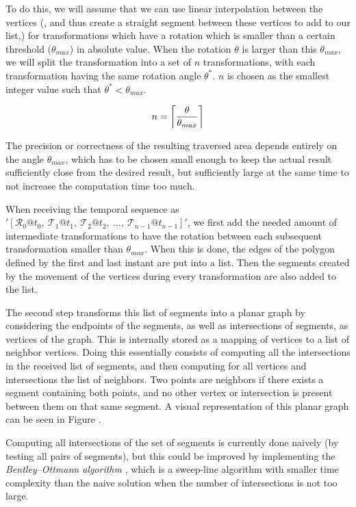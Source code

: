 To do this, we will assume that we can use linear interpolation between the vertices (, and thus create a straight segment between these vertices to add to our list,) for transformations which have a rotation which is smaller than a certain threshold ($\theta_{max}$) in absolute value. When the rotation $\theta$ is larger than this $\theta_{max}$, we will split the transformation into a set of $n$ transformations, with each transformation having the same rotation angle $\theta^*$. $n$ is chosen as the smallest integer value such that $\theta^* < \theta_{max}$.

\[
    n = \ceil*{\frac{\theta}{\theta_{max}}}
\]

The precision or correctness of the resulting traversed area depends entirely on the angle $\theta_{max}$, which has to be chosen small enough to keep the actual result sufficiently close from the desired result, but sufficiently large at the same time to not increase the computation time too much.

When receiving the temporal sequence as $'[\mathcal{R}_0@t_0,\ \mathcal{T}_1@t_1,\ \mathcal{T}_2@t_2,\ ...,\ \mathcal{T}_{n-1}@t_{n-1}]'$, we first add the needed amount of intermediate transformations to have the rotation between each subsequent transformation smaller than $\theta_{max}$. When this is done, the edges of the polygon defined by the first and last instant are put into a list. Then the segments created by the movement of the vertices during every transformation are also added to the list.


The second step transforms this list of segments into a planar graph by considering the endpoints of the segments, as well as intersections of segments, as vertices of the graph. This is internally stored as a mapping of vertices to a list of neighbor vertices. Doing this essentially consists of computing all the intersections in the received list of segments, and then computing for all vertices and intersections the list of neighbors. Two points are neighbors if there exists a segment containing both points, and no other vertex or intersection is present between them on that same segment. A visual representation of this planar graph can be seen in Figure .

Computing all intersections of the set of segments is currently done naively (by testing all pairs of segments), but this could be improved by implementing the \textit{Bentley–Ottmann algorithm} \cite{computational_geometry}, which is a sweep-line algorithm with smaller time complexity than the naive solution when the number of intersections is not too large.

